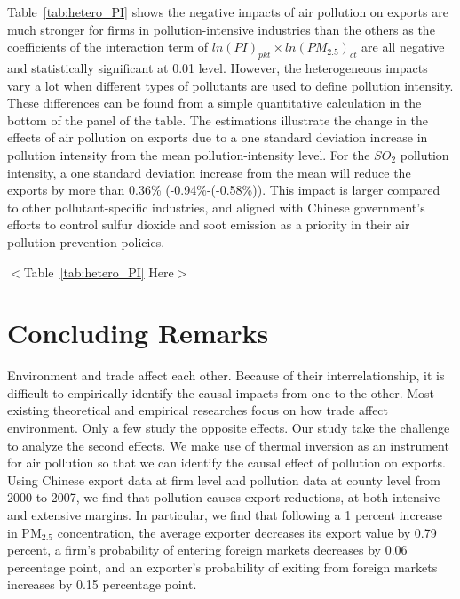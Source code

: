 \documentclass[12pt]{article}
\begin{document}
  Table~\ref{tab:hetero_PI} shows the negative impacts of air pollution
  on exports are much stronger for firms in pollution-intensive industries than the
  others as the coefficients of the interaction term of $ln(PI)_{pkt}\times ln(PM_{2.5})_{ct}$ 
  are all negative and statistically significant at 0.01 level. However, the heterogeneous impacts vary a 
  lot when different types of pollutants are used to define pollution intensity. These differences can be found from a simple quantitative calculation in the bottom of the panel of the table. The estimations
  illustrate the change in the effects of air pollution on exports due to a one standard deviation increase in pollution intensity from the mean pollution-intensity level. For the $SO_{2}$ pollution intensity, a one standard deviation increase from the mean will reduce the exports by more than 0.36\% (-0.94\%-(-0.58\%)). This impact is larger compared to other pollutant-specific industries, and aligned with Chinese government's efforts to control sulfur dioxide and soot emission as a priority in their air pollution prevention policies.
  

  \begin{center}
    $<$Table~\ref{tab:hetero_PI} Here$>$
    \end{center}


\section{Concluding Remarks}  \label{cons}
Environment and trade affect each other. Because of their interrelationship, it is difficult to empirically identify the causal impacts from one to the other. Most existing theoretical and empirical researches focus on how trade affect environment. Only a few study the opposite effects. Our study take the challenge to analyze the second effects. We make use of thermal inversion as an instrument for air pollution so that we can identify the causal effect of pollution on exports. Using Chinese export data at firm level and pollution data at county level from 2000 to 2007, we find that pollution causes export reductions, at both intensive and extensive margins. In particular, we find that following a 1 percent increase in $\mathrm{PM_{2.5}}$ concentration, the average exporter decreases its export value by 0.79 percent, a firm's probability of entering foreign markets decreases by 0.06 percentage point, and an exporter's probability of exiting from foreign markets increases by 0.15 percentage point. 
\end{document}
